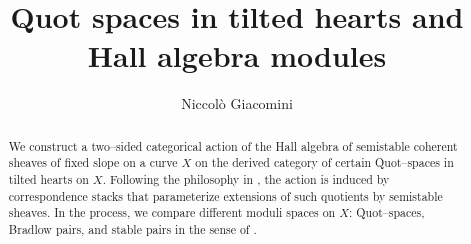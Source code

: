 \documentclass[11pt]{article}
\title{Quot spaces in tilted hearts and Hall algebra modules}
\author{Niccolò Giacomini}
\date{}
\begin{document}
\maketitle

\begin{abstract}
    \noindent We construct a two--sided categorical action of the Hall algebra of semistable coherent sheaves of fixed slope on a curve $X$ on the derived category of certain Quot--spaces in tilted hearts on $X$. Following the philosophy in \cite{dps}, the action is induced by correspondence stacks that parameterize extensions of such quotients by semistable sheaves. In the process, we compare different moduli spaces on $X$: Quot--spaces, Bradlow pairs, and stable pairs in the sense of \cite{dps}.
\end{abstract}

\bigskip

\tableofcontents
\end{document}
